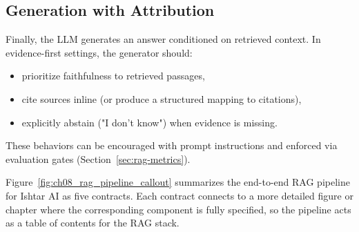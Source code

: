 \subsection{Generation with Attribution}
Finally, the LLM generates an answer conditioned on retrieved context. In evidence-first settings, the generator should:
\begin{itemize}
    \item prioritize faithfulness to retrieved passages,
    \item cite sources inline (or produce a structured mapping to citations),
    \item explicitly abstain ("I don't know") when evidence is missing.
\end{itemize}
These behaviors can be encouraged with prompt instructions and enforced via evaluation gates (Section~\ref{sec:rag-metrics}).

Figure~\ref{fig:ch08_rag_pipeline_callout} summarizes the end-to-end RAG pipeline for Ishtar AI as five contracts. Each contract connects to a more detailed figure or chapter where the corresponding component is fully specified, so the pipeline acts as a table of contents for the RAG stack.

